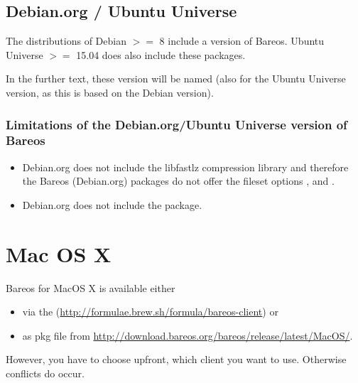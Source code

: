 \subsection{Debian.org / Ubuntu Universe}
\label{sec:DebianOrg}

The distributions of Debian $>=$ 8 include a version of Bareos.
Ubuntu Universe $>=$ 15.04 does also include these packages. 

In the further text, these version will be named  
(also for the Ubuntu Universe version, as this is based on the Debian version).

\subsubsection{Limitations of the Debian.org/Ubuntu Universe version of Bareos}
\label{sec:DebianOrgLimitations}

    \begin{itemize}
        \item Debian.org does not include the libfastlz compression library and therefore the Bareos (Debian.org) packages do not offer the fileset options ,  and .
        \item Debian.org does not include the  package.
    \end{itemize}



\section{Mac OS X}
\label{sec:macosx}

Bareos for MacOS X is available either

\begin{itemize}
  \item via the  (\url{http://formulae.brew.sh/formula/bareos-client}) or
  \item as pkg file from \url{http://download.bareos.org/bareos/release/latest/MacOS/}.
\end{itemize}


However, you have to choose upfront, which client you want to use. Otherwise conflicts do occur.

